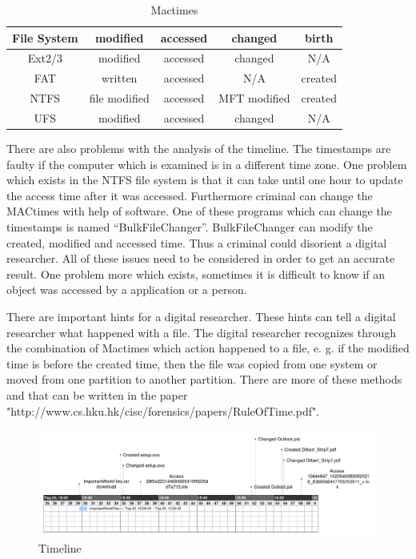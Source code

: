 \begin{table}[h]

\begin{tabular}{c|c|c|c|c}
	File System & modified & accessed & changed & birth \\
	\hline \hline
	Ext2/3 & modified & accessed & changed & N/A \\
	\hline
	FAT & written & accessed & N/A & created \\
	\hline
	NTFS & file modified & accessed & MFT modified & created \\
	\hline
	UFS & modified & accessed & changed & N/A \\

\end{tabular}

\caption{Mactimes}
\label{fig:Mactimes}
\end{table}

There are also problems with the analysis of the timeline. The timestamps are faulty if the computer which is examined is in a different time zone. One problem which exists in the NTFS file system is that it can take until one hour to update the access time after it was accessed. Furthermore criminal can change the MACtimes with help of software. One of these programs which can change the timestamps is named “BulkFileChanger”. BulkFileChanger can modify the created, modified and accessed time. Thus a criminal could disorient a digital researcher. All of these issues need to be considered in order to get an accurate result. One problem more which exists, sometimes it is difficult to know if an object was accessed by a application or a person. 

There are important hints for a digital researcher. These hints can tell a digital researcher what happened with a file. The digital researcher recognizes through the combination of Mactimes which action happened to a file, e. g. if the modified time is before the created time, then the file was copied from one system or moved from one partition to another partition. There are more of these methods and that can be written in the paper "http://www.cs.hku.hk/cisc/forensics/papers/RuleOfTime.pdf".









\begin{figure}[tbph]
	\centering
		\includegraphics[width=\textwidth]{graphics/Timeline.pdf} 	
	\caption{Timeline}
	\label{fig:timeline}
\end{figure}






